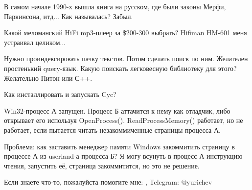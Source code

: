 \myhrule{}

В самом начале 1990-х вышла книга на русском, где были законы Мерфи, Паркинсона, итд...
Как называлась?
Забыл.

\myhrule{}

Какой меломанский HiFi mp3-плеер за \$200-300 выбрать?
Hifiman HM-601 меня устраивал целиком...

\myhrule{}

Нужно проиндексировать пачку текстов. Потом сделать поиск по ним. Желателен простенький query-язык.
Какую поискать легковесную библиотеку для этого?
Желательно Питон или С++.

\myhrule{}

Как инсталлировать и запускать Cyc?

\myhrule{}

Win32-процесс А запущен.
Процесс Б аттачится к нему как отладчик, либо открывает его используя OpenProcess().
ReadProcessMemory() работает, но не работает, если пытается читать незакоммиченные страницы процесса А.

Проблема: как заставить менеджер памяти Windows закоммитить страницу в процессе А из userland-а процесса Б?
Я могу всунуть в процесс А инструкцию чтения, запустить её, страница закоммитится, но это не решение.

\myhrule{}

Если знаете что-то, пожалуйста помогите мне: \EMAIL{}, Telegram: @yurichev
